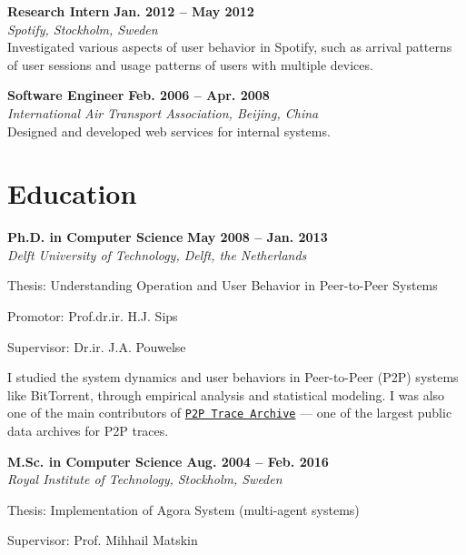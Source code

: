 \documentclass[margin,line]{resume}
\begin{document}
\begin{resume}
\textbf{Research Intern} \hfill \textbf{Jan. 2012 -- May 2012} \vspace{0.75mm} \\%
\textsl{Spotify, Stockholm, Sweden} \vspace{1.5mm} \\
Investigated various aspects of user behavior in Spotify, such as arrival
patterns of user sessions and usage patterns of users with multiple
devices.

\textbf{Software Engineer} \hfill \textbf{Feb. 2006 -- Apr. 2008} \vspace{0.75mm} \\%
\textsl{International Air Transport Association, Beijing, China} \vspace{1.5mm} \\
Designed and developed web services for internal systems.

\section{\mysidestyle Education}
\textbf{Ph.D. in Computer Science} \hfill \textbf{May 2008 -- Jan. 2013} \vspace{0.75mm} \\%
\textsl{Delft University of Technology, Delft, the Netherlands} \vspace{-2.5mm} \\
\begin{list2}
    \item Thesis: Understanding Operation and User Behavior in Peer-to-Peer Systems
    \item Promotor: Prof.dr.ir. H.J. Sips
    \item Supervisor: Dr.ir. J.A. Pouwelse
\end{list2}
\vspace{-3mm}
I studied the system dynamics and user behaviors in Peer-to-Peer (P2P) systems
like BitTorrent, through empirical analysis and statistical modeling.
I was also one of the main contributors of
\href{http://p2pta.ewi.tudelft.nl/}{\texttt{P2P Trace Archive}} ---
one of the largest public data archives for P2P traces.

\newpage

\textbf{M.Sc. in Computer Science} \hfill \textbf{Aug. 2004 -- Feb. 2016} \vspace{0.75mm} \\%
\textsl{Royal Institute of Technology, Stockholm, Sweden} \vspace{-2.5mm} \\
\begin{list2}
    \item Thesis: Implementation of Agora System (multi-agent systems)
    \item Supervisor: Prof. Mihhail Matskin
\end{list2}\vspace{-1.5mm}


\end{resume}
\end{document}
